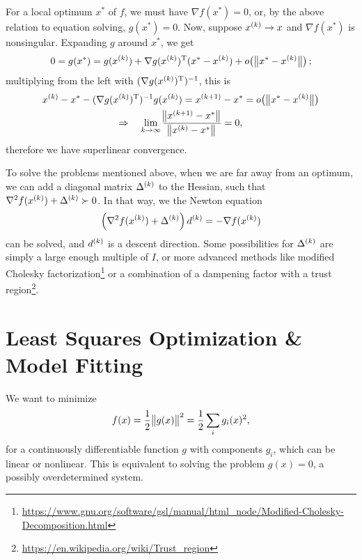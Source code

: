 \documentclass{article}
\begin{document}
\label{s:newton-local-convergence}

For a local optimum \(x^*\) of \(f\), we must have \(\nabla f(x^*) = 0\), or, by the above relation
to equation solving, \(g(x^*) = 0\).  Now, suppose \(x^{(k)} \to x\) and \(\nabla f(x^*)\) is
nonsingular.  Expanding \(g\) around \(x^*\), we get
\begin{equation*}
  0 = g(x^*) = g(\kth{x}) + \T{\nabla g(\kth{x})} (x^* - \kth{x}) + o\!\del[1]{\,\enVert[1]{x^* - \kth{x}}};
\end{equation*}
multiplying from the left with \((\nabla g(x^{(k)})^{\mathrm{T}})^{-1}\), this is
\begin{gather*}
  \kth{x} - x^* - (\T{\nabla g(\kth{x})})^{-1} g(\kth{x}) = \kth[k+1]{x} - x^* = o\!\del[1]{\,\enVert[1]{x^* - \kth{x}}} \\
  \Rightarrow \quad \lim_{k \to \infty} \frac{\enVert[1]{\kth[k+1]{x} - x^*}}{\enVert[1]{\kth{x} - x^*}} = 0,
\end{gather*}
therefore we have superlinear convergence.


\label{s:newton-global-convergence}

To solve the problems mentioned above, when we are far away from an optimum, we can add a diagonal
matrix \(\Delta^{(k)}\) to the Hessian, such that \(\nabla^2 f(x^{(k)}) + \Delta^{(k)} \succ 0\).
In that way, we the Newton equation
\begin{equation*}
  \left( \nabla^2 f(x^{(k)}) + \Delta^{(k)} \right) d^{(k)} = -\nabla f(x^{(k)})
\end{equation*}
can be solved, and \(d^{(k)}\) is a descent direction.  Some possibilities for \(\Delta^{(k)}\) are
simply a large enough multiple of \(I\), or more advanced methods like modified Cholesky
factorization\footnote{\url{https://www.gnu.org/software/gsl/manual/html_node/Modified-Cholesky-Decomposition.html}}
or a combination of a dampening factor with a trust
region\footnote{\url{https://en.wikipedia.org/wiki/Trust_region}}.


\section{Least Squares Optimization \& Model Fitting}

\label{s:least-squares}

We want to minimize
\begin{equation*}
  f(x) = \frac{1}{2} \enVert[1]{g(x)}^2 = \frac{1}{2} \sum_i g_i(x)^2,
\end{equation*}
for a continuously differentiable function \(g\) with components \(g_i\), which can be linear or
nonlinear.  This is equivalent to solving the problem \(g(x) = 0\), a possibly overdetermined
system.
\end{document}
